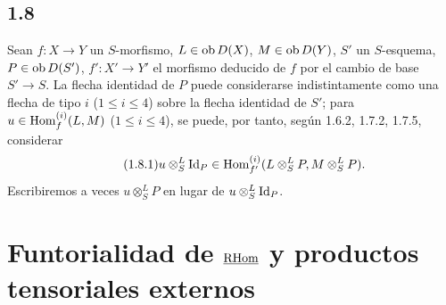 \subsection*{1.8}
Sean $f:X\to Y$ un $S$-morfismo, $L\in\operatorname{ob} D(X)$, $M\in\operatorname{ob} D(Y)$, $S'$ un $S$-esquema, $P\in\operatorname{ob} D(S')$, $f':X'\to Y'$ el morfismo deducido de $f$ por el cambio de base $S'\to S$. La flecha identidad de $P$ puede considerarse indistintamente como una flecha de tipo $i$ ($1\leq i\leq4$) sobre la flecha identidad de $S'$; para $u\in\operatorname{Hom}_f^{(i)}(L,M)$ ($1\leq i\leq4$), se puede, por tanto, según 1.6.2, 1.7.2, 1.7.5, considerar
\begin{equation}\tag{1.8.1}
u\otimes^{L}_{S}\mathrm{Id}_P\in\operatorname{Hom}_{f'}^{(i)}(L\otimes^{L}_{S}P,M\otimes^{L}_{S}P).
\end{equation}
Escribiremos a veces $u\otimes^{L}_{S}P$ en lugar de $u\otimes^{L}_{S}\mathrm{Id}_P$.

\section{Funtorialidad de \texorpdfstring{$\underline{\mathrm{RHom}}$}{RHom} y productos tensoriales externos}
